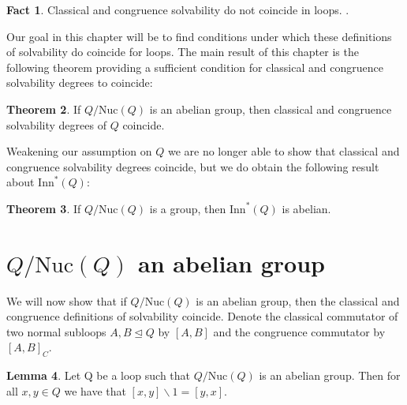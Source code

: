 \documentclass[12pt, twoside, openright]{report}
\theoremstyle{definition}
\newtheorem{thm}{Theorem}[chapter]
\newtheorem{fct}[thm]{Fact}
\newtheorem{lem}[thm]{Lemma}
\newcommand{\ldv}{\backslash}       %
\newcommand{\nuc}{\text{Nuc}}       %
\newcommand{\inn}{\text{Inn}}       %
\begin{document}
\begin{fct}
  Classical and congruence solvability do not coincide in loops. \cite{ComTheory}.
\end{fct}

Our goal in this chapter will be to find conditions under which these definitions of solvability
  do coincide for loops. The main result of this chapter is the following theorem providing a
  sufficient condition for classical and congruence solvability degrees to coincide: 

\begin{thm}
  If $Q/\nuc(Q)$ is an abelian group, then classical and congruence solvability degrees of $Q$ coincide.
\end{thm}

Weakening our assumption on $Q$ we are no longer able to show that classical and congruence
  solvability degrees coincide, but we do obtain the following result about $\inn^*(Q)$:

\begin{thm}
  If $Q/\nuc(Q)$ is a group, then $\inn^*(Q)$ is abelian.
\end{thm}


\section{$Q/\nuc(Q)$ an abelian group}
\label{sec:nucVar}

We will now show that if $Q/\nuc(Q)$ is an abelian group, then the classical and congruence definitions
  of solvability coincide. Denote the classical commutator of two normal subloops $A, B\unlhd Q$ by
  $[A, B]$ and the congruence commutator by $[A, B]_C$.

\begin{lem}\label{lem-1}
  Let Q be a loop such that $Q/\nuc(Q)$ is an abelian group. Then for all $x, y\in Q$ we have
    that $[x, y]\ldv 1 = [y, x]$.
\end{lem}
\end{document}
